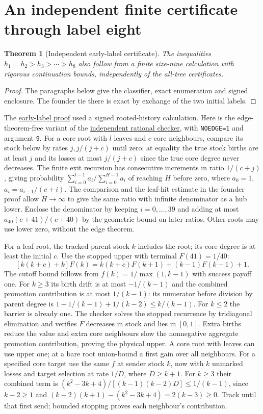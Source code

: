 \documentclass[11pt]{article}
\newcommand{\proofsrc}[2]{\href{https://github.com/uzay-eth/friend-tree-exponent/blob/a0972085ad72ad5685ae7b424988648d1965e73c/#1}{#2}}
\newtheorem{theorem}{Theorem}
\newcommand{\resulttag}{?}
\newcommand{\tagnext}[1]{\renewcommand{\resulttag}{#1}}
\theoremstyle{remark}
\numberwithin{equation}{section}
\begin{document}
\section{An independent finite certificate through label eight}\label{sec:early}
\tagnext{EARLY}
\begin{theorem}[Independent early-label certificate]\label{th:hub-early-order}
The inequalities $h_1=h_2>h_3>\cdots>h_8$ also follow from a finite size-nine calculation with rigorous continuation bounds, independently of the all-tree certificates.
\end{theorem}
\begin{proof}
The paragraphs below give the classifier, exact enumeration and signed enclosure. The founder tie there is exact by exchange of the two initial labels.
\end{proof}
The \proofsrc{round2/proofs/fable/newground/q3-hub-probability/REPORT.md}{early-label proof} used a signed rooted-history calculation. Here is the edge-theorem-free variant of the \proofsrc{round2/proofs/fable/newground/q3-hub-probability/lead-hub_order_exact.py}{independent rational checker}, with \texttt{NOEDGE=1} and argument \texttt{9}. For a core root with $l$ leaves and $c$ core neighbours, compare its stock below by rates $j,j/(j+c)$ until zero: at equality the true stock births are at least $j$ and its losses at most $j/(j+c)$ since the true core degree never decreases. The finite exit recursion has consecutive increments in ratio $1/(c+j)$, giving probability $\sum_{i=0}^{l-1}a_i/\sum_{i=0}^{H-1}a_i$ of reaching $H$ before zero, where $a_0=1$, $a_i=a_{i-1}/(c+i)$. The comparison and the leaf-hit estimate in the founder proof allow $H\to\infty$ to give the same ratio with infinite denominator as a hub lower. Enclose the denominator by keeping $i=0,\ldots,39$ and adding at most $a_{40}(c+41)/(c+40)$ by the geometric bound on later ratios. Other roots may use lower zero, without the edge theorem.

For a leaf root, the tracked parent stock $k$ includes the root; its core degree is at least the initial $c$. Use the stopped upper with terminal $F(41)=1/40$:
\[
 [k(k+c)+k]F(k)=k(k+c)F(k+1)+(k-1)F(k-1)+1 .
\]
The cutoff bound follows from $f(k)=1/\max(1,k-1)$ with success payoff one. For $k\ge3$ its birth drift is at most $-1/(k-1)$ and the combined promotion contribution is at most $1/(k-1)$: its numerator before division by parent degree is $1-1/(k-1)+1/(k-2)\le k/(k-1)$. For $k\le2$ the barrier is already one. The checker solves the stopped recurrence by tridiagonal elimination and verifies $F$ decreases in stock and lies in $[0,1]$. Extra births reduce the value and extra core neighbours slow the nonnegative aggregate promotion contribution, proving the physical upper. A core root with leaves can use upper one; at a bare root union-bound a first gain over all neighbours. For a specified core target use the same $f$ at sender stock $k$, now with $k$ unmarked losses and target selection at rate $1/D$, where $D\ge k+1$. For $k\ge3$ their combined term is $(k^2-3k+4)/[(k-1)(k-2)D]\le1/(k-1)$, since $k-2\ge1$ and $(k-2)(k+1)-(k^2-3k+4)=2(k-3)\ge0$. Track until that first send; bounded stopping proves each neighbour's contribution.
\end{document}
